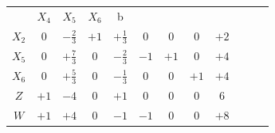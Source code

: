 \documentclass{beamer}
\begin{document}
\begin{frame}
{\begin{table}
\begin{tabular}{c c c c c c c c c c c c}
				&\cellcolor{blue!100} \color{white} $\scriptstyle X_4$ 
				&\cellcolor{blue!100} \color{red}   $\scriptstyle X_5$ 
				&\cellcolor{blue!100} \color{red}   $\scriptstyle X_6$ 
				&\cellcolor{blue!100} \color{white} \scriptsize b
				&
				&
				& \\
				\cellcolor{blue!100} \color{red} $\scriptstyle X_2$
				& \cellcolor{yellow!50} $\scriptstyle 0$
				& \cellcolor{yellow!50} $\scriptstyle -\frac{2}{3}$
				& \cellcolor{yellow!50} $\scriptstyle +1$
				& \cellcolor{yellow!50} $\scriptstyle +\frac{1}{3}$
				& \cellcolor{yellow!50} $\scriptstyle 0$
				& \cellcolor{yellow!50} $\scriptstyle 0$
				& \cellcolor{yellow!50} $\scriptstyle 0$
				& \cellcolor{yellow!50} $\scriptstyle +2$ \\
			    \cellcolor{blue!100} \color{red} $\scriptstyle X_5$
				& \cellcolor{yellow!50} $\scriptstyle 0$
				& \cellcolor{yellow!50} $\scriptstyle +\frac{7}{3}$
				& \cellcolor{yellow!50} $\scriptstyle 0$
				& \cellcolor{yellow!50} $\scriptstyle -\frac{2}{3}$			
				& \cellcolor{yellow!50} $\scriptstyle -1$
				& \cellcolor{yellow!50} $\scriptstyle +1$
				& \cellcolor{yellow!50} $\scriptstyle 0$ 
				& \cellcolor{yellow!50} $\scriptstyle +4$ \\
				\cellcolor{blue!100} \color{red} $\scriptstyle X_6$
				& \cellcolor{yellow!50} $\scriptstyle 0$
				& \cellcolor{yellow!50} $\scriptstyle +\frac{5}{3}$
				& \cellcolor{yellow!50} $\scriptstyle 0$
				& \cellcolor{yellow!50} $\scriptstyle -\frac{1}{3}$
				& \cellcolor{yellow!50} $\scriptstyle 0$
				& \cellcolor{yellow!50} $\scriptstyle 0$
				& \cellcolor{yellow!50} $\scriptstyle +1$
				& \cellcolor{yellow!50} $\scriptstyle +4$ \\
				\cellcolor{blue!100} \color{white} $\scriptstyle Z$
				& \cellcolor{yellow!50} $\scriptstyle +1$
				& \cellcolor{yellow!50} $\scriptstyle -4$
				& \cellcolor{yellow!50} $\scriptstyle 0$
				& \cellcolor{yellow!50} $\scriptstyle +1$
				& \cellcolor{yellow!50} $\scriptstyle 0$
				& \cellcolor{yellow!50} $\scriptstyle 0$
				& \cellcolor{yellow!50} $\scriptstyle 0$ 
				& \cellcolor{yellow!50} $\scriptstyle 6$  \\
				\cellcolor{blue!100} \color{white} $\scriptstyle W$
				& \cellcolor{yellow!90} $\scriptstyle +1$
				& \cellcolor{yellow!90} $\scriptstyle +4$
				& \cellcolor{yellow!90} $\scriptstyle 0$
				& \cellcolor{yellow!90} $\scriptstyle -1$
				& \cellcolor{yellow!90} $\scriptstyle -1$
				& \cellcolor{yellow!90} $\scriptstyle 0$
				& \cellcolor{yellow!90} $\scriptstyle 0$ 
				& \cellcolor{yellow!90} $\scriptstyle +8$  \\

\end{tabular}
\end{table}}
\end{frame}
\end{document}
